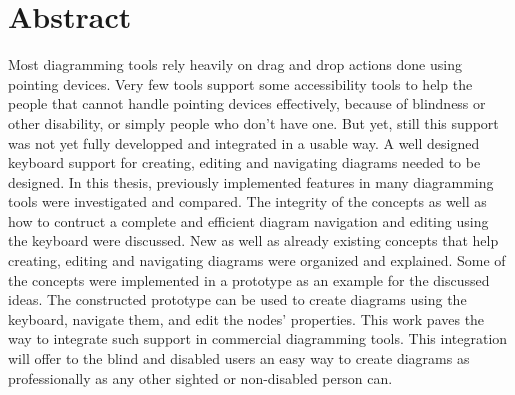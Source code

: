 \chapter*{Abstract}
\beginchapter
\begin{comment}
The abstract is a very important and obligatory part of the report
allowing the potential reader to judge, if he is the target of this
report.  The abstract should be written with broadly understandable
technical language and should be self-contained, i.e. should not
contain any references or citations. Also the usage of abbreviations
and acronyms should be avoided, since the same acronyms or
abbreviations can have different meanings on different research
fields.  The abstract should typically contain about 300 words and in
any cases not more than one page.  The definition of the research
field and the most important outcome of the presented research are the
obligatory components of the abstract.
\end{comment}

\vspace{2cm}

\begin{spacing}{1.5}
Most diagramming tools rely heavily on drag and drop actions done using pointing devices. Very few tools support some accessibility tools to help the people that cannot handle pointing devices effectively, because of blindness or other disability, or simply people who don't have one. But yet, still this support was not yet fully developped and integrated in a usable way. A well designed keyboard support for creating, editing and navigating diagrams needed to be designed. In this thesis, previously implemented features in many diagramming tools were investigated and compared. The integrity of the concepts as well as how to contruct a complete and efficient diagram navigation and editing using the keyboard were discussed. New as well as already existing concepts that help creating, editing and navigating diagrams were organized and explained. Some of the concepts were implemented in a prototype as an example for the discussed ideas. The constructed prototype can be used to create diagrams using the keyboard, navigate them, and edit the nodes' properties. This work paves the way to integrate such support in commercial diagramming tools. This integration will offer to the blind and disabled users an easy way to create diagrams as professionally as any other sighted or non-disabled person can.
\end{spacing}
